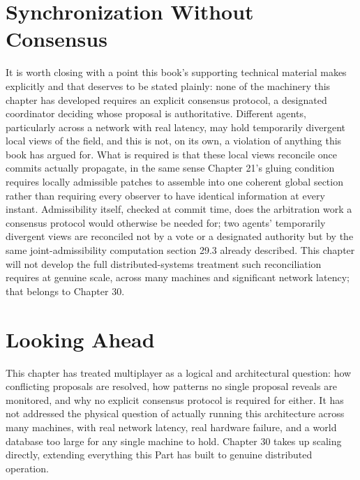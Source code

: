 \section{Synchronization Without Consensus}

It is worth closing with a point this book's supporting technical material makes explicitly and that deserves to be stated plainly: none of the machinery this chapter has developed requires an explicit consensus protocol, a designated coordinator deciding whose proposal is authoritative. Different agents, particularly across a network with real latency, may hold temporarily divergent local views of the field, and this is not, on its own, a violation of anything this book has argued for. What is required is that these local views reconcile once commits actually propagate, in the same sense Chapter 21's gluing condition requires locally admissible patches to assemble into one coherent global section rather than requiring every observer to have identical information at every instant. Admissibility itself, checked at commit time, does the arbitration work a consensus protocol would otherwise be needed for; two agents' temporarily divergent views are reconciled not by a vote or a designated authority but by the same joint-admissibility computation section 29.3 already described. This chapter will not develop the full distributed-systems treatment such reconciliation requires at genuine scale, across many machines and significant network latency; that belongs to Chapter 30.

\section{Looking Ahead}

This chapter has treated multiplayer as a logical and architectural question: how conflicting proposals are resolved, how patterns no single proposal reveals are monitored, and why no explicit consensus protocol is required for either. It has not addressed the physical question of actually running this architecture across many machines, with real network latency, real hardware failure, and a world database too large for any single machine to hold. Chapter 30 takes up scaling directly, extending everything this Part has built to genuine distributed operation.
